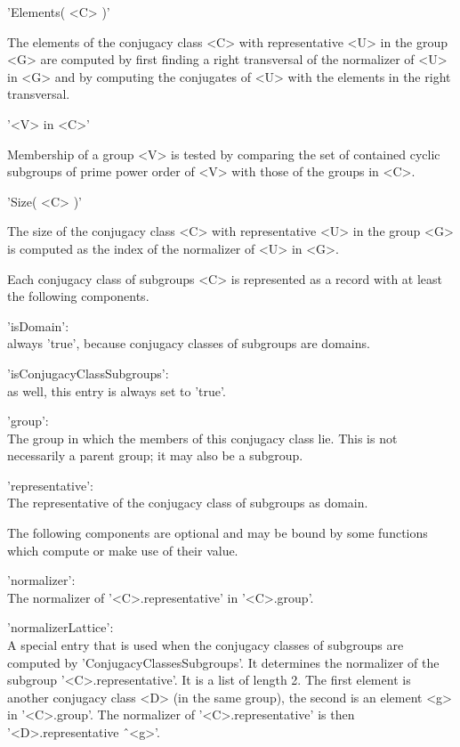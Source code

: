 \vspace{5mm}
'Elements( <C> )'%

The elements of  the conjugacy  class <C> with representative <U> in  the
group  <G> are  computed  by  first finding a  right transversal  of  the
normalizer of <U> in <G> and by computing the conjugates  of <U> with the
elements in the right transversal.

\vspace{5mm}
'<V> in <C>'%

Membership of a  group <V> is tested  by comparing  the set  of contained
cyclic  subgroups of prime power order of <V> with those of the groups in
<C>.

\vspace{5mm}
'Size( <C> )'%

The size of the  conjugacy class <C> with representative <U> in the group
<G> is computed as the index of the normalizer of <U> in <G>.


Each conjugacy class of subgroups <C> is represented as a  record with at
least the following components.

'isDomain': \\
        always  'true',  because  conjugacy   classes  of  subgroups  are
        domains.

'isConjugacyClassSubgroups': \\
        as well, this entry is always set to 'true'.

'group': \\
        The group in which the members of this conjugacy class lie.  This
        is not necessarily a parent group; it may also be a subgroup.

'representative': \\
        The representative of the conjugacy class of subgroups as domain.

The following  components are optional and may be bound by some functions
which compute or make use of their value.

'normalizer': \\
        The normalizer of '<C>.representative' in '<C>.group'.

'normalizerLattice': \\
        A  special  entry  that is  used when  the conjugacy  classes  of
        subgroups  are  computed   by  'ConjugacyClassesSubgroups'.    It
        determines the normalizer of the  subgroup  '<C>.representative'.
        It is a list of length 2.  The first element is another conjugacy
        class <D>  (in the same group), the  second is an element  <g> in
        '<C>.group'.   The normalizer  of  '<C>.representative'  is  then
        '<D>.representative \^\ <g>'.

